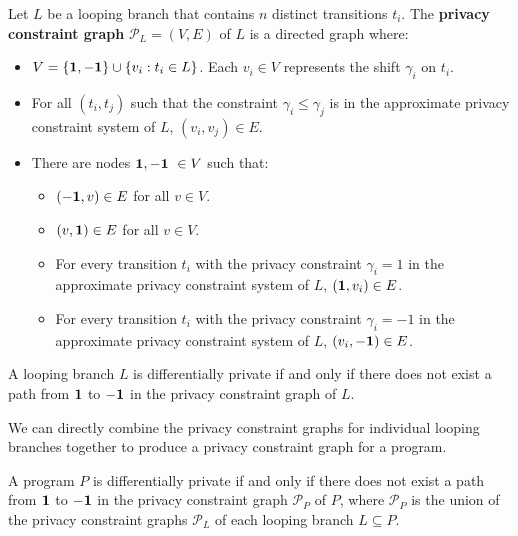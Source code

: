 \begin{defn}
    Let $L$ be a looping branch that contains $n$ distinct transitions $t_i$. The \textbf{privacy constraint graph} $\mathcal{P}_L = (V, E)$ of $L$ is a directed graph where: 
    \begin{itemize}
        \item $V = \{{\bf 1, -1}\} \cup \{v_i: t_i\in L\}$. Each $v_i \in V$ represents the shift $\gamma_i$ on $t_i$.
        \item For all $(t_i, t_j)$ such that the constraint $\gamma_i \leq \gamma_j$ is in the approximate privacy constraint system of $L$, $(v_i, v_j) \in E$.
        \item There are nodes ${\bf 1, -1}\ \in V$ such that: 
        \begin{itemize}
            \item $({\bf -1}, v)\in E$ for all $v \in V$.
            \item $(v, {\bf 1})\in E$ for all $v \in V$.
            \item For every transition $t_i$ with the privacy constraint $\gamma_i = 1$ in the approximate privacy constraint system of $L$, $({\bf 1}, v_i) \in E$.
            \item For every transition $t_i$ with the privacy constraint $\gamma_i = -1$ in the approximate privacy constraint system of $L$, $(v_i, {\bf -1}) \in E$. 
        \end{itemize}
    \end{itemize}

\end{defn}

\begin{prop}\label{privacyConstraintGraphProp}
    A looping branch $L$ is differentially private if and only if there does not exist a path from $\bf 1$ to $\bf -1$ in the privacy constraint graph of $L$.
\end{prop}

We can directly combine the privacy constraint graphs for individual looping branches together to produce a privacy constraint graph for a program. 

\begin{prop}\label{programPrivacyConstraintGraphPathReq}
    A program $P$ is differentially private if and only if there does not exist a path from $\bf 1$ to $\bf -1$ in the privacy constraint graph $\mathcal{P}_P$ of $P$, where $\mathcal{P}_P$ is the union of the privacy constraint graphs $\mathcal{P}_L$ of each looping branch $L\subseteq P$.
\end{prop}


